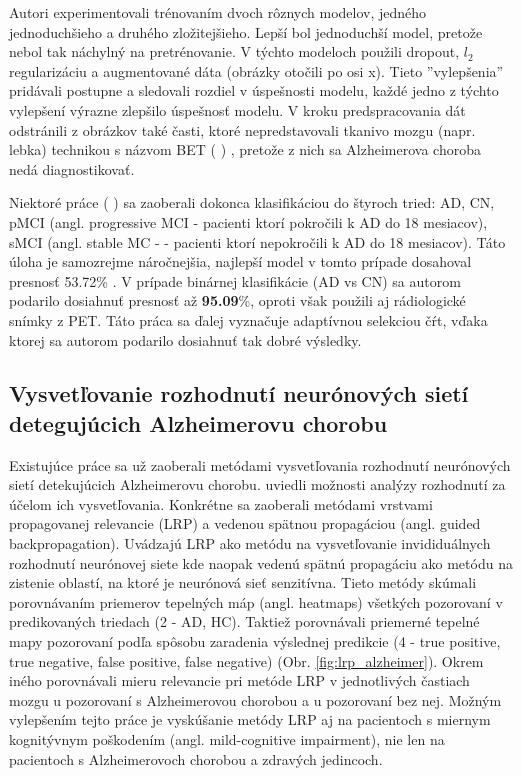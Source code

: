 Autori experimentovali trénovaním dvoch rôznych modelov, jedného jednoduchšieho a druhého zložitejšieho. Lepší bol jednoduchší model, pretože nebol tak náchylný na pretrénovanie. V týchto modeloch použili dropout, $l_2$ regularizáciu a augmentované dáta (obrázky otočili po osi x). Tieto ''vylepšenia'' pridávali postupne a sledovali rozdiel v úspešnosti modelu, každé jedno z týchto vylepšení výrazne zlepšilo úspešnosť modelu. V kroku predspracovania dát odstránili z obrázkov také časti, ktoré nepredstavovali tkanivo mozgu (napr. lebka) technikou s názvom BET (\citeauthor*{smith2002fast} \citeyear{smith2002fast}) \cite{smith2002fast}, pretože z nich sa Alzheimerova choroba nedá diagnostikovať.

Niektoré práce (\citeauthor*{suk2016deep} \citeyear{suk2016deep}) sa zaoberali dokonca klasifikáciou do štyroch tried: AD, CN, pMCI (angl. progressive MCI - pacienti ktorí pokročili k AD do 18 mesiacov), sMCI (angl. stable MC - - pacienti ktorí nepokročili k AD do 18 mesiacov). Táto úloha je samozrejme náročnejšia, najlepší model v tomto prípade dosahoval presnosť 53.72\% \cite{suk2016deep}. V prípade binárnej klasifikácie (AD vs CN) sa autorom podarilo dosiahnuť presnosť až \textbf{95.09}\%, oproti \citeauthor*{esmaeilzadeh2018end} však použili aj rádiologické snímky z PET. Táto práca sa ďalej vyznačuje adaptívnou selekciou čŕt, vďaka ktorej sa autorom podarilo dosiahnuť tak dobré výsledky.



\subsection{Vysvetľovanie rozhodnutí neurónových sietí detegujúcich Alzheimerovu chorobu \label{sec:ad_nn_explanation}}

Existujúce práce sa už zaoberali metódami vysvetľovania rozhodnutí neurónových sietí detekujúcich Alzheimerovu chorobu. \citeauthor{bohle2019layer} \citeyear{bohle2019layer} uviedli možnosti analýzy rozhodnutí za účelom ich vysvetľovania. Konkrétne sa zaoberali metódami vrstvami propagovanej relevancie (LRP) a vedenou spätnou propagáciou (angl. guided backpropagation). Uvádzajú LRP ako metódu na vysvetľovanie invididuálnych rozhodnutí neurónovej siete kde naopak vedenú spätnú propagáciu ako metódu na zistenie oblastí, na ktoré je neurónová sieť senzitívna. Tieto metódy skúmali porovnávaním priemerov tepelných máp (angl. heatmaps) všetkých pozorovaní v predikovaných triedach (2 - AD, HC). Taktiež porovnávali priemerné tepelné mapy pozorovaní podľa spôsobu zaradenia výslednej predikcie (4 - true positive, true negative, false positive, false negative) (Obr. \ref{fig:lrp_alzheimer}). Okrem iného porovnávali mieru relevancie pri metóde LRP v jednotlivých častiach mozgu u pozorovaní s Alzheimerovou chorobou a u pozorovaní bez nej. Možným vylepšením tejto práce je vyskúšanie metódy LRP aj na pacientoch s miernym kognitývnym poškodením (angl. mild-cognitive impairment), nie len na pacientoch s Alzheimerovoch chorobou a zdravých jedincoch.

